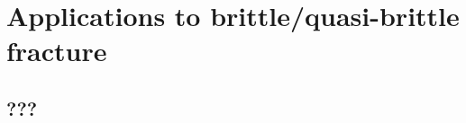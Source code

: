 \section{Applications to brittle/quasi-brittle fracture}

\sectioncover

\subsection{???}

\begin{frame}
\end{frame}
